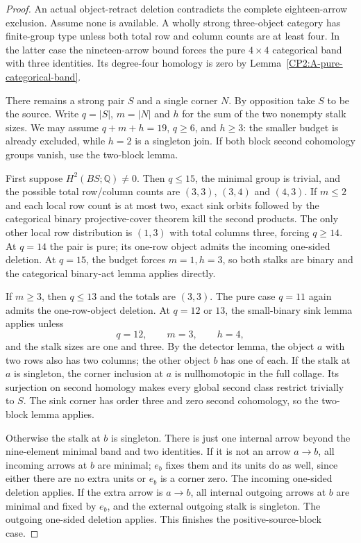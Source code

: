 \begin{proof}
An actual object-retract deletion contradicts the complete
eighteen-arrow exclusion. Assume none is available. A wholly
strong three-object category has finite-group type unless both
total row and column counts are at least four. In the latter
case the nineteen-arrow bound forces the pure $4\times4$
categorical band with three identities. Its degree-four homology
is zero by Lemma~\ref{CP2:A-pure-categorical-band}.

There remains a strong pair $S$ and a single corner $N$. By
opposition take $S$ to be the source. Write $q=|S|$, $m=|N|$
and $h$ for the sum of the two nonempty stalk sizes. We may
assume $q+m+h=19$, $q\ge6$, and $h\ge3$: the smaller budget
is already excluded, while $h=2$ is a singleton join.
If both block second cohomology groups vanish, use the two-block
lemma.

First suppose $H^2(BS;\mathbb Q)\ne0$. Then $q\le15$, the
minimal group is trivial, and the possible total row/column
counts are $(3,3)$, $(3,4)$ and $(4,3)$. If $m\le2$ and
each local row count is at most two, exact sink orbits followed
by the categorical binary projective-cover theorem kill the
second products. The only other local row distribution is
$(1,3)$ with total columns three, forcing $q\ge14$. At $q=14$
the pair is pure; its one-row object admits the incoming one-sided
deletion. At $q=15$, the budget forces $m=1,h=3$, so both stalks
are binary and the categorical binary-act lemma applies directly.

If $m\ge3$, then $q\le13$ and the totals are $(3,3)$.
The pure case $q=11$ again admits the one-row-object deletion.
At $q=12$ or $13$, the small-binary sink lemma applies unless
\[
 q=12,\qquad m=3,\qquad h=4,
\]
and the stalk sizes are one and three. By the detector lemma,
the object $a$ with two rows also has two columns; the other
object $b$ has one of each. If the stalk at $a$ is singleton,
the corner inclusion at $a$ is nullhomotopic in the full collage.
Its surjection on second homology makes every global second class
restrict trivially to $S$. The sink corner has order three and
zero second cohomology, so the two-block lemma applies.

Otherwise the stalk at $b$ is singleton. There is just one
internal arrow beyond the nine-element minimal band and two
identities. If it is not an arrow $a\to b$, all incoming
arrows at $b$ are minimal; $e_b$ fixes them and its units do
as well, since either there are no extra units or $e_b$ is a
corner zero. The incoming one-sided deletion applies. If the
extra arrow is $a\to b$, all internal outgoing arrows at $b$
are minimal and fixed by $e_b$, and the external outgoing
stalk is singleton. The outgoing one-sided deletion applies.
This finishes the positive-source-block case.


\end{proof}
